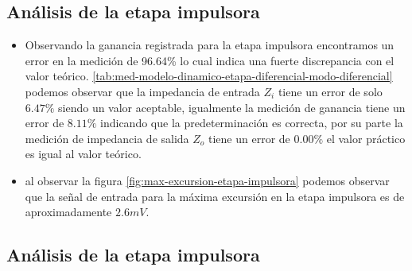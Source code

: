 \subsection{Análisis de la etapa impulsora}


\begin{itemize}
    \item Observando la ganancia registrada para la etapa impulsora encontramos un error en la medición de 96.64\% lo cual indica una fuerte discrepancia con el valor teórico. \ref{tab:med-modelo-dinamico-etapa-diferencial-modo-diferencial} podemos observar que la impedancia de entrada $Z_i$ tiene un error de solo $6.47\%$ siendo un valor aceptable, igualmente la medición de ganancia tiene un error de $8.11\%$ indicando que la predeterminación es correcta, por su parte la medición de impedancia de salida $Z_o$ tiene un error de $0.00\%$ el valor práctico es igual al valor teórico.
    \item al observar la figura \ref{fig:max-excursion-etapa-impulsora} podemos observar que la señal de entrada para la máxima excursión en la etapa impulsora es de aproximadamente $2.6mV$.
\end{itemize}


\subsection{Análisis de la etapa impulsora}


